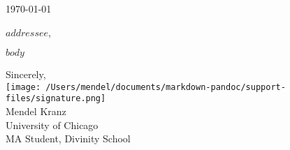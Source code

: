 \documentclass[$if(fontsize)$$fontsize$$else$11pt$endif$]{letter}
\begin{document}
\thispagestyle{fancy}
\renewcommand{\headrulewidth}{0pt}
\fancyfoot{}

\today

{$addressee$,}

$body$


Sincerely,\\\texttt{[image: /Users/mendel/documents/markdown-pandoc/support-files/signature.png]}\\Mendel Kranz\\University of Chicago\\MA Student, Divinity School
\end{document}
